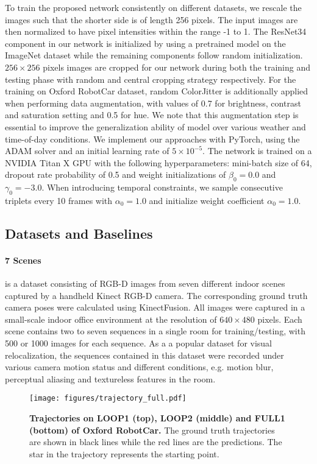 \documentclass[letterpaper]{article}
\begin{document}
To train the proposed network consistently on different datasets, we rescale the images such that the shorter side is of length 256 pixels. The input images are then normalized to have  pixel intensities within the range -1 to 1. The ResNet34 \cite{he2016deep} component in our network is initialized by using a pretrained model on the ImageNet dataset while the remaining components follow random initialization. $256\times256$ pixels images are cropped for our network during both the training and testing phase with random and central cropping strategy respectively. For the training on Oxford RobotCar dataset, random ColorJitter is additionally applied when performing data augmentation, with values of 0.7 for brightness, contrast and saturation setting and 0.5 for hue. We note that this augmentation step is essential to improve the generalization ability of model over various weather and time-of-day conditions. We implement our approaches with PyTorch, using the ADAM solver \cite{kingma2014adam} and an initial learning rate of $5\times10^{-5}$. The network is trained on a NVIDIA Titan X GPU with the following hyperparameters: mini-batch size of 64, dropout rate probability of 0.5 and weight initializations of $\beta_0=0.0$ and $\gamma_0=-3.0$. When introducing temporal constraints, we sample consecutive triplets every 10 frames with $\alpha_0=1.0$ and initialize weight coefficient $\alpha_0=1.0$.

\subsection{Datasets and Baselines}

\paragraph{7 Scenes} \cite{shotton2013scene}
is a dataset consisting of RGB-D images from seven different indoor scenes captured by a handheld Kinect RGB-D camera. The corresponding ground truth camera poses were calculated using KinectFusion. All images were captured in a small-scale indoor office environment at the resolution of $640\times480$ pixels. Each scene contains two to seven sequences in a single room for training/testing, with 500 or 1000 images for each sequence. As a a popular dataset for visual relocalization, the sequences contained in this dataset were recorded under various camera motion status and different conditions, e.g. motion blur, perceptual aliasing and textureless features in the room.
\begin{figure*}[t]
    \centering
    \texttt{[image: figures/trajectory\_full.pdf]}
\caption{\textbf{Trajectories on LOOP1 (top), LOOP2 (middle) and FULL1 (bottom) of Oxford RobotCar.} The ground truth trajectories are shown in black lines while the red lines are the predictions. The star in the trajectory represents the starting point.}
    \label{fig:Trajectory}
    \vspace{-0.5cm}
\end{figure*}
\end{document}
